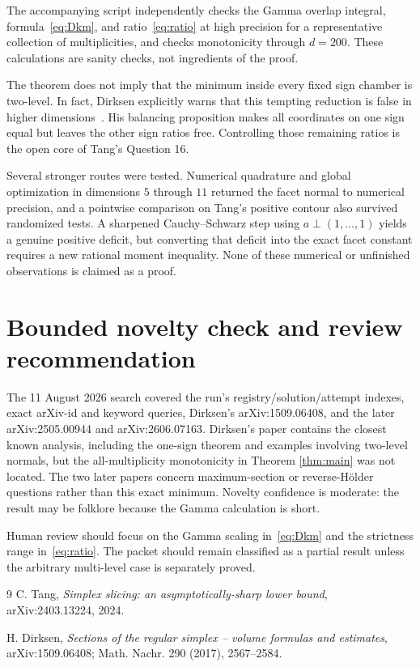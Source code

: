 \documentclass[11pt]{article}
\begin{document}
The accompanying script independently checks the Gamma overlap integral,
formula~\eqref{eq:Dkm}, and ratio~\eqref{eq:ratio} at high precision for a
representative collection of multiplicities, and checks monotonicity through
$d=200$.  These calculations are sanity checks, not ingredients of the proof.

The theorem does not imply that the minimum inside every fixed sign chamber is
two-level.  In fact, Dirksen explicitly warns that this tempting reduction is
false in higher dimensions~\cite[Remark 3.4 and Lemma 3.6]{Dirksen2016}.
His balancing proposition makes all coordinates on one sign equal but leaves
the other sign ratios free.  Controlling those remaining ratios is the open
core of Tang's Question 16.

Several stronger routes were tested.  Numerical quadrature and global
optimization in dimensions $5$ through $11$ returned the facet normal to
numerical precision, and a pointwise comparison on Tang's positive contour
also survived randomized tests.  A sharpened Cauchy--Schwarz step using
$a\perp(1,\ldots,1)$ yields a genuine positive deficit, but converting that
deficit into the exact facet constant requires a new rational moment
inequality.  None of these numerical or unfinished observations is claimed as
a proof.

\section{Bounded novelty check and review recommendation}

The 11 August 2026 search covered the run's registry/solution/attempt indexes,
exact arXiv-id and keyword queries, Dirksen's arXiv:1509.06408, and the later
arXiv:2505.00944 and arXiv:2606.07163.  Dirksen's paper contains the closest
known analysis, including the one-sign theorem and examples involving
two-level normals, but the all-multiplicity monotonicity in Theorem
\ref{thm:main} was not located.  The two later papers concern maximum-section
or reverse-H\"older questions rather than this exact minimum.  Novelty
confidence is moderate: the result may be folklore because the Gamma
calculation is short.

Human review should focus on the Gamma scaling in~\eqref{eq:Dkm} and the
strictness range in~\eqref{eq:ratio}.  The packet should remain classified as
a partial result unless the arbitrary multi-level case is separately proved.

\begin{thebibliography}{9}
C. Tang,
\emph{Simplex slicing: an asymptotically-sharp lower bound},
arXiv:2403.13224, 2024.

H. Dirksen,
\emph{Sections of the regular simplex -- volume formulas and estimates},
arXiv:1509.06408; Math. Nachr. 290 (2017), 2567--2584.
\end{thebibliography}
\end{document}
